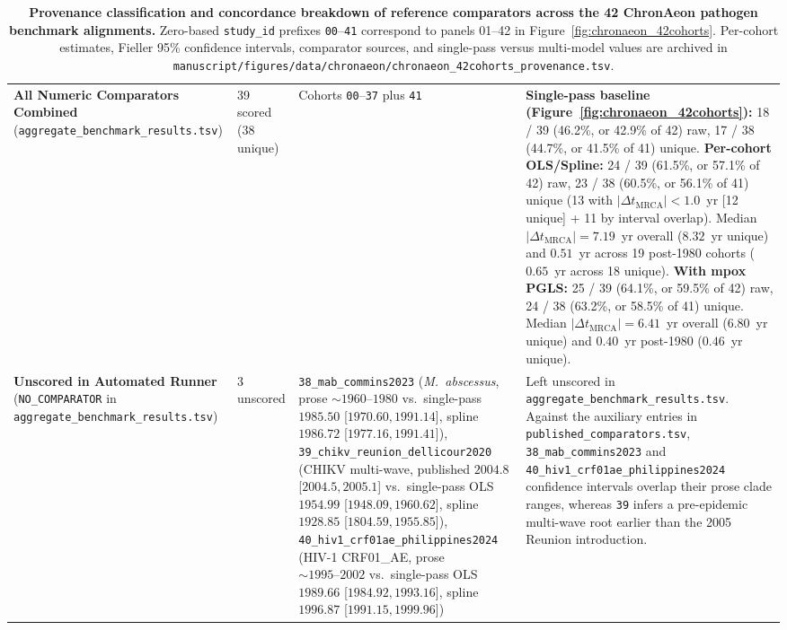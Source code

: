 \documentclass[11pt,letterpaper]{article}
\newcommand{\tool}[1]{\textsf{#1}}
\begin{document}
\begin{table}[!htbp]
\begin{tabularx}{\textwidth}{p{3.1cm}p{1.7cm}p{4.2cm}X}
\addlinespace
\textbf{All Numeric Comparators Combined} \newline (\nolinkurl{aggregate_benchmark_results.tsv}) & 39 scored \newline (38 unique) &
Cohorts \texttt{00}--\texttt{37} plus \texttt{41} &
\textbf{Single-pass baseline (Figure~\ref{fig:chronaeon_42cohorts}):} 18 / 39 (46.2\%, or 42.9\% of 42) raw, 17 / 38 (44.7\%, or 41.5\% of 41) unique. \newline
\textbf{Per-cohort OLS/Spline:} 24 / 39 (61.5\%, or 57.1\% of 42) raw, 23 / 38 (60.5\%, or 56.1\% of 41) unique (13 with $|\Delta t_{\mathrm{MRCA}}| < 1.0$~yr [12 unique] + 11 by interval overlap). Median $|\Delta t_{\mathrm{MRCA}}| = 7.19$~yr overall ($8.32$~yr unique) and $0.51$~yr across 19 post-1980 cohorts ($0.65$~yr across 18 unique). \newline
\textbf{With mpox PGLS:} 25 / 39 (64.1\%, or 59.5\% of 42) raw, 24 / 38 (63.2\%, or 58.5\% of 41) unique. Median $|\Delta t_{\mathrm{MRCA}}| = 6.41$~yr overall ($6.80$~yr unique) and $0.40$~yr post-1980 ($0.46$~yr unique). \\
\addlinespace
\textbf{Unscored in Automated Runner} \newline (\texttt{NO\_COMPARATOR} in \nolinkurl{aggregate_benchmark_results.tsv}) & 3 unscored &
\nolinkurl{38_mab_commins2023} (\textit{M.\ abscessus}, prose $\sim 1960\text{--}1980$ vs.\ single-pass $1985.50$ [$1970.60, 1991.14$], spline $1986.72$ [$1977.16, 1991.41$]), \newline
\nolinkurl{39_chikv_reunion_dellicour2020} (CHIKV multi-wave, published $2004.8$ [$2004.5, 2005.1$] vs.\ single-pass OLS $1954.99$ [$1948.09, 1960.62$], spline $1928.85$ [$1804.59, 1955.85$]), \newline
\nolinkurl{40_hiv1_crf01ae_philippines2024} (HIV-1 CRF01\_AE, prose $\sim 1995\text{--}2002$ vs.\ single-pass OLS $1989.66$ [$1984.92, 1993.16$], spline $1996.87$ [$1991.15, 1999.96$]) &
Left unscored in \nolinkurl{aggregate_benchmark_results.tsv}. Against the auxiliary entries in \nolinkurl{published_comparators.tsv}, \nolinkurl{38_mab_commins2023} and \nolinkurl{40_hiv1_crf01ae_philippines2024} confidence intervals overlap their prose clade ranges, whereas \texttt{39} infers a pre-epidemic multi-wave root earlier than the 2005 Reunion introduction. \\
\bottomrule
\end{tabularx}
\caption{\textbf{Provenance classification and concordance breakdown of reference comparators across the 42 \tool{ChronAeon} pathogen benchmark alignments.} Zero-based \texttt{study\_id} prefixes \texttt{00}--\texttt{41} correspond to panels 01--42 in Figure~\ref{fig:chronaeon_42cohorts}. Per-cohort estimates, Fieller 95\% confidence intervals, comparator sources, and single-pass versus multi-model values are archived in \nolinkurl{manuscript/figures/data/chronaeon/chronaeon_42cohorts_provenance.tsv}.}
\label{tab:chronaeon_comparators}
\end{table}
\end{document}
